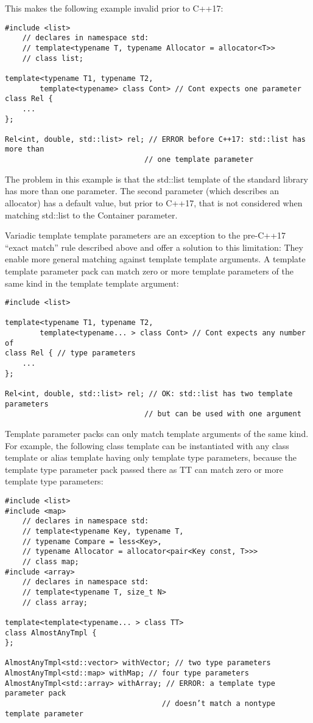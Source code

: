 This makes the following example invalid prior to C++17:

\begin{lstlisting}[style=styleCXX]
#include <list>
	// declares in namespace std:
	// template<typename T, typename Allocator = allocator<T>>
	// class list;

template<typename T1, typename T2,
		template<typename> class Cont> // Cont expects one parameter
class Rel {
	...
};

Rel<int, double, std::list> rel; // ERROR before C++17: std::list has more than
								// one template parameter
\end{lstlisting}

The problem in this example is that the std::list template of the standard library has more than one parameter. The second parameter (which describes an allocator) has a default value, but prior to C++17, that is not considered when matching std::list to the Container parameter.

Variadic template template parameters are an exception to the pre-C++17 “exact match” rule described above and offer a solution to this limitation: They enable more general matching against template template arguments. A template template parameter pack can match zero or more template parameters of the same kind in the template template argument:

\begin{lstlisting}[style=styleCXX]
#include <list>

template<typename T1, typename T2,
		template<typename... > class Cont> // Cont expects any number of
class Rel { // type parameters
	...
};

Rel<int, double, std::list> rel; // OK: std::list has two template parameters
								// but can be used with one argument
\end{lstlisting}

Template parameter packs can only match template arguments of the same kind. For example, the following class template can be instantiated with any class template or alias template having only template type parameters, because the template type parameter pack passed there as TT can match zero or more template type parameters:

\begin{lstlisting}[style=styleCXX]
#include <list>
#include <map>
	// declares in namespace std:
	// template<typename Key, typename T,
	// typename Compare = less<Key>,
	// typename Allocator = allocator<pair<Key const, T>>>
	// class map;
#include <array>
	// declares in namespace std:
	// template<typename T, size_t N>
	// class array;
	
template<template<typename... > class TT>
class AlmostAnyTmpl {
};

AlmostAnyTmpl<std::vector> withVector; // two type parameters
AlmostAnyTmpl<std::map> withMap; // four type parameters
AlmostAnyTmpl<std::array> withArray; // ERROR: a template type parameter pack
									// doesn’t match a nontype template parameter
\end{lstlisting}

